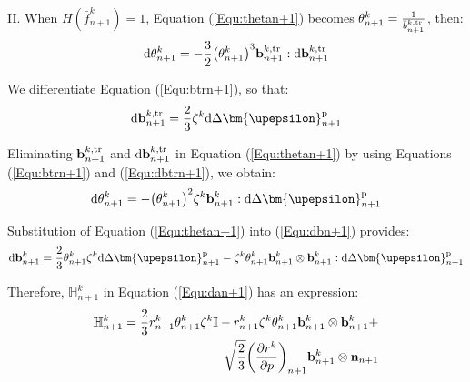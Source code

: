 II. When $H\left( {\bar f_{n + 1}^k} \right) = 1$, Equation (\ref{Equ:thetan+1}) becomes $\theta _{n + 1}^k = \frac{1}{{\bar b_{n + 1}^{k,{\rm{tr}}}}}$, then:
\begin{equation}
\label{Equ:thetan+1}
{\text{d}}\theta _{n + 1}^k =  - \frac{3}{2}{\left( {\theta _{n + 1}^k} \right)^3}{\bf{b}}_{n + 1}^{k,{\rm{tr}}}:{\text{d}}{\bf{b}}_{n + 1}^{k,{\rm{tr}}}
\end{equation}

We differentiate Equation (\ref{Equ:btrn+1}), so that:
\begin{equation}
\label{Equ:dbtrn+1}
{\text{d}}{\bf{b}}_{n + 1}^{k,{\rm{tr}}} = \frac{2}{3}{\zeta ^k}{\text{d}}\Delta {\bm{\upepsilon }}_{n + 1}^{\rm{p}}
\end{equation}

Eliminating ${\bf{b}}_{n + 1}^{k,{\rm{tr}}}$ and ${\text{d}}{\bf{b}}_{n + 1}^{k,{\rm{tr}}}$ in Equation (\ref{Equ:thetan+1}) by using Equations (\ref{Equ:btrn+1}) and (\ref{Equ:dbtrn+1}), we obtain:
\begin{equation}
\label{Equ:thetan+1}
{\text{d}}\theta _{n + 1}^k =  - {\left( {\theta _{n + 1}^k} \right)^2}{\zeta ^k}{\bf{b}}_{n + 1}^k:{\text{d}}\Delta {\bm{\upepsilon }}_{n + 1}^{\rm{p}}
\end{equation}

Substitution of Equation (\ref{Equ:thetan+1}) into (\ref{Equ:dbn+1}) provides:
\begin{equation}
\label{Equ:dbn+12}
{\text{d}}{\bf{b}}_{n + 1}^k = \frac{2}{3}\theta _{n + 1}^k{\zeta ^k}{\text{d}}\Delta {\bm{\upepsilon }}_{n + 1}^{\rm{p}} - {\zeta ^k}\theta _{n + 1}^k{\bf{b}}_{n + 1}^k \otimes {\bf{b}}_{n + 1}^k:{\text{d}}\Delta {\bm{\upepsilon }}_{n + 1}^{\rm{p}}
\end{equation}

Therefore, $\mathbb{H}_{n + 1}^k$ in Equation (\ref{Equ:dan+1}) has an expression:
\begin{equation}
\begin{aligned}
\mathbb{H}_{n + 1}^k = \frac{2}{3}r_{n + 1}^k\theta _{n + 1}^k{\zeta ^k}\mathbb{I} - r_{n + 1}^k{\zeta ^k}\theta _{n + 1}^k{\bf{b}}_{n + 1}^k \otimes {\bf{b}}_{n + 1}^k + \\
\sqrt {\frac{2}{3}} {\left( {\frac{{\partial {r^k}}}{{\partial p}}} \right)_{n + 1}}{\bf{b}}_{n + 1}^k \otimes {{\bf{n}}_{n + 1}}
\end{aligned}
\end{equation}